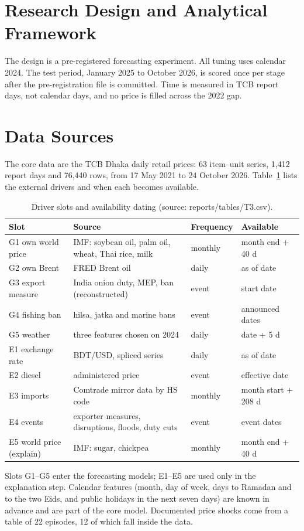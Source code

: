 \documentclass[12pt]{report}
\begin{document}
\section{Research Design and Analytical Framework}
The design is a pre-registered forecasting experiment. All tuning uses calendar 2024. The test period, January 2025 to October 2026, is scored once per stage after the pre-registration file is committed. Time is measured in TCB report days, not calendar days, and no price is filled across the 2022 gap.

\section{Data Sources}
The core data are the TCB Dhaka daily retail prices: 63 item--unit series, 1,412 report days and 76,440 rows, from 17 May 2021 to 24 October 2026. Table~\ref{tab:drivers} lists the external drivers and when each becomes available.
\begin{table}[H]\centering\small
\caption{Driver slots and availability dating (source: reports/tables/T3.csv).}\label{tab:drivers}
\begin{tabular}{p{3.0cm}p{5.6cm}p{2.4cm}p{2.2cm}}
\toprule
Slot & Source & Frequency & Available \\ \midrule
G1 own world price & IMF: soybean oil, palm oil, wheat, Thai rice, milk & monthly & month end + 40 d \\
G2 own Brent & FRED Brent oil & daily & as of date \\
G3 export measure & India onion duty, MEP, ban (reconstructed) & event & start date \\
G4 fishing ban & hilsa, jatka and marine bans & event & announced dates \\
G5 weather & three features chosen on 2024 & daily & date + 5 d \\
E1 exchange rate & BDT/USD, spliced series & daily & as of date \\
E2 diesel & administered price & event & effective date \\
E3 imports & Comtrade mirror data by HS code & monthly & month start + 208 d \\
E4 events & exporter measures, disruptions, floods, duty cuts & event & event dates \\
E5 world price (explain) & IMF: sugar, chickpea & monthly & month end + 40 d \\
\bottomrule
\end{tabular}
\end{table}
Slots G1--G5 enter the forecasting models; E1--E5 are used only in the explanation step. Calendar features (month, day of week, days to Ramadan and to the two Eids, and public holidays in the next seven days) are known in advance and are part of the core model. Documented price shocks come from a table of 22 episodes, 12 of which fall inside the data.
\end{document}
